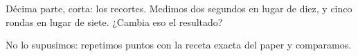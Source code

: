 Décima parte, corta: los recortes. Medimos dos segundos en lugar de diez, y cinco rondas en lugar de siete. ¿Cambia eso el resultado?

No lo supusimos: repetimos puntos con la receta exacta del paper y comparamos.
